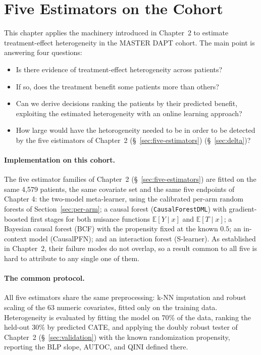 \section{Five Estimators on the Cohort}

This chapter applies the machinery introduced in Chapter~2 to estimate
treatment-effect heterogeneity in the MASTER DAPT cohort. The main point is
answering four questions:

\begin{itemize}
  \item Is there evidence of treatment-effect heterogeneity across patients?
  \item If so, does the treatment benefit some patients more than others?
  \item Can we derive decisions ranking the patients by their predicted benefit,
  exploiting the estimated heterogeneity with an online learning approach?
  \item How large would have the hetorogeneity needed to be in order to be detected by the five eistimators of Chapter~2 (\S~\ref{sec:five-estimators})
        (\S~\ref{sec:delta})?
\end{itemize}

\paragraph{Implementation on this cohort.}
The five estimator families of Chapter~2 (\S~\ref{sec:five-estimators}) are
fitted on the same 4,579 patients, the same covariate set and the same five
endpoints of Chapter 4: the two-model meta-learner, using the calibrated
per-arm random forests of Section~\ref{sec:per-arm}; a causal forest
(\texttt{CausalForestDML}) with gradient-boosted first stages for both
nuisance functions $\mathbb{E}[Y \mid x]$ and $\mathbb{E}[T \mid x]$; a
Bayesian causal forest (BCF) with the propensity fixed at the known $0.5$;
an in-context model (CausalPFN); and an interaction forest (S-learner). As
established in Chapter~2, their failure modes do not overlap, so a result
common to all five is hard to attribute to any single one of them.

\paragraph{The common protocol.}
All five estimators share the same preprocessing: k-NN imputation and robust
scaling of the 63 numeric covariates, fitted only on the training data.
Heterogeneity is evaluated by fitting the model on 70\% of the data, ranking
the held-out 30\% by
predicted CATE, and applying the doubly robust tester of Chapter~2
(\S~\ref{sec:validation}) with the known randomization propensity, reporting
the BLP slope, AUTOC, and QINI defined there.

